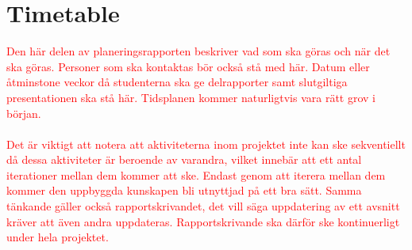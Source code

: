 \section{Timetable}
\textcolor{red}{
Den här delen av planeringsrapporten beskriver vad som ska göras och när det ska göras. Personer som ska kontaktas bör också stå med här. Datum eller åtminstone veckor då studenterna ska ge delrapporter samt slutgiltiga presentationen ska stå här. Tidsplanen kommer naturligtvis vara rätt grov i början.
\\\\
Det är viktigt att notera att aktiviteterna inom projektet inte kan ske sekventiellt då dessa aktiviteter är beroende av varandra, vilket innebär att ett antal iterationer mellan dem kommer att ske. Endast genom att iterera mellan dem kommer den uppbyggda kunskapen bli utnyttjad på ett bra sätt. Samma tänkande gäller också rapportskrivandet, det vill säga uppdatering av ett avsnitt kräver att även andra uppdateras. Rapportskrivande ska därför ske kontinuerligt under hela projektet.
}